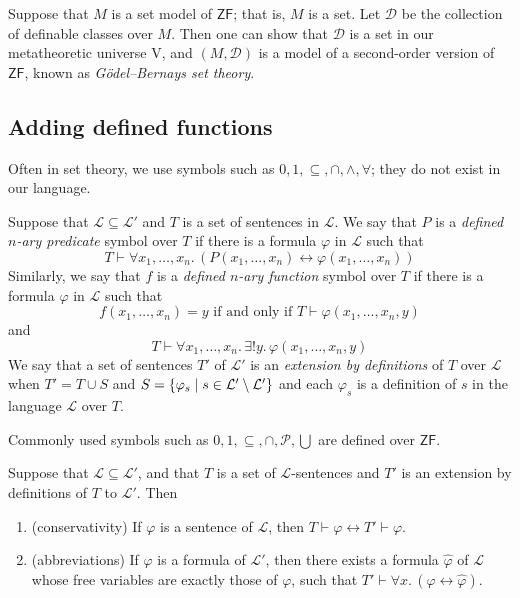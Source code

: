 Suppose that \( M \) is a set model of \( \mathsf{ZF} \); that is, \( M \) is a set.
Let \( \mathcal D \) be the collection of definable classes over \( M \).
Then one can show that \( \mathcal D \) is a set in our metatheoretic universe \( \mathrm{V} \), and \( (M, \mathcal D) \) is a model of a second-order version of \( \mathsf{ZF} \), known as \emph{G\"odel--Bernays set theory}.

\subsection{Adding defined functions}
Often in set theory, we use symbols such as \( 0, 1, \subseteq, \cap, \wedge, \forall \); they do not exist in our language.
\begin{definition}
    Suppose that \( \mathcal L \subseteq \mathcal L' \) and \( T \) is a set of sentences in \( \mathcal L \).
    We say that \( P \) is a \emph{defined \( n \)-ary predicate} symbol over \( T \) if there is a formula \( \varphi \) in \( \mathcal L \) such that
    \[ T \vdash \forall x_1, \dots, x_n.\, (P(x_1, \dots, x_n) \leftrightarrow \varphi(x_1, \dots, x_n)) \]
    Similarly, we say that \( f \) is a \emph{defined \( n \)-ary function} symbol over \( T \) if there is a formula \( \varphi \) in \( \mathcal L \) such that
    \[ f(x_1, \dots, x_n) = y \text{ if and only if } T \vdash \varphi(x_1, \dots, x_n, y) \]
    and
    \[ T \vdash \forall x_1, \dots, x_n.\, \exists! y.\, \varphi(x_1, \dots, x_n, y) \]
    We say that a set of sentences \( T' \) of \( \mathcal L' \) is an \emph{extension by definitions} of \( T \) over \( \mathcal L \) when \( T' = T \cup S \) and \( S = \qty{\varphi_s \mid s \in \mathcal L' \setminus \mathcal L'} \) and each \( \varphi_s \) is a definition of \( s \) in the language \( \mathcal L \) over \( T \).
\end{definition}
Commonly used symbols such as \( 0, 1, \subseteq, \cap, \mathcal P, \bigcup \) are defined over \( \mathsf{ZF} \).
\begin{theorem}
    Suppose that \( \mathcal L \subseteq \mathcal L' \), and that \( T \) is a set of \( \mathcal L \)-sentences and \( T' \) is an extension by definitions of \( T \) to \( \mathcal L' \).
    Then
    \begin{enumerate}
        \item (conservativity) If \( \varphi \) is a sentence of \( \mathcal L \), then \( T \vdash \varphi \leftrightarrow T' \vdash \varphi \).
        \item (abbreviations) If \( \varphi \) is a formula of \( \mathcal L' \), then there exists a formula \( \hat\varphi \) of \( \mathcal L \) whose free variables are exactly those of \( \varphi \), such that \( T' \vdash \forall x.\, (\varphi \leftrightarrow \hat\varphi) \).
    \end{enumerate}
\end{theorem}
